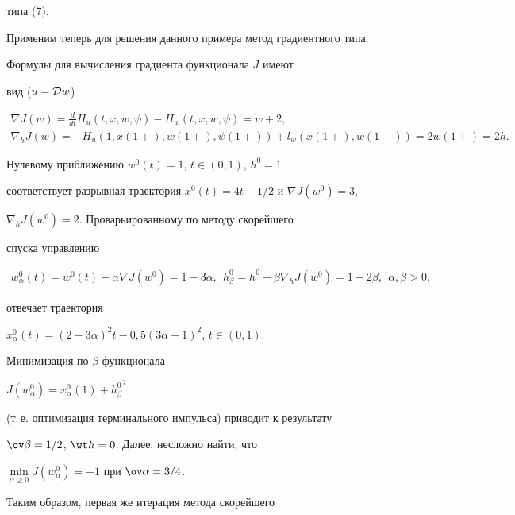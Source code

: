 типа (7).


 


Применим теперь для решения данного примера метод градиентного типа.


 


Формулы для вычисления градиента функционала $J$ имеют


вид ($u={\cal D}w$)


\begin{gather*}


\nabla J(w)=\frac{d}{dt}H_u(t,x,w,\psi) - H_w(t,x,w,\psi)=w+2,\\


\nabla_hJ(w) = -H_u(1,x(1+),w(1+),\psi(1+)) + l_w(x(1+),w(1+)) =


2w(1+) = 2h.


\end{gather*}


Нулевому приближению $w^0(t)=1$, $t\in (0,1)$, $h^0=1$ 


соответствует разрывная траектория $x^0(t)=4t-1/2$ и $\nabla J(w^0)=3$,


$\nabla_h J(w^0) =2$. Проварьированному по методу скорейшего


спуска управлению


\begin{gather*}


w^0_\alpha(t)=w^0(t) - \alpha \nabla J(w^0) = 1-3\alpha, \ \ 


h^0_\beta = h^0-\beta \nabla_h J(w^0) = 1-2\beta, \ \ \alpha, \beta >0,


\end{gather*}


отвечает траектория


$x^0_\alpha(t)=(2-3\alpha)^2t-0,5(3\alpha-1)^2$, $t\in(0,1)$.


Минимизация по $\beta$ функционала


$J(w^0_\alpha)=x^0_\alpha(1) + {h^0_\beta}^2$ 


(т.\,е. оптимизация терминального импульса) приводит к результату


$\ov \beta = 1/2$, $\wt h = 0$. Далее, несложно найти, что


$\min\limits_{\alpha \ge 0}J(w^0_\alpha) = -1$ при $\ov \alpha =3/4$.


 


Таким образом, первая же итерация метода скорейшего


